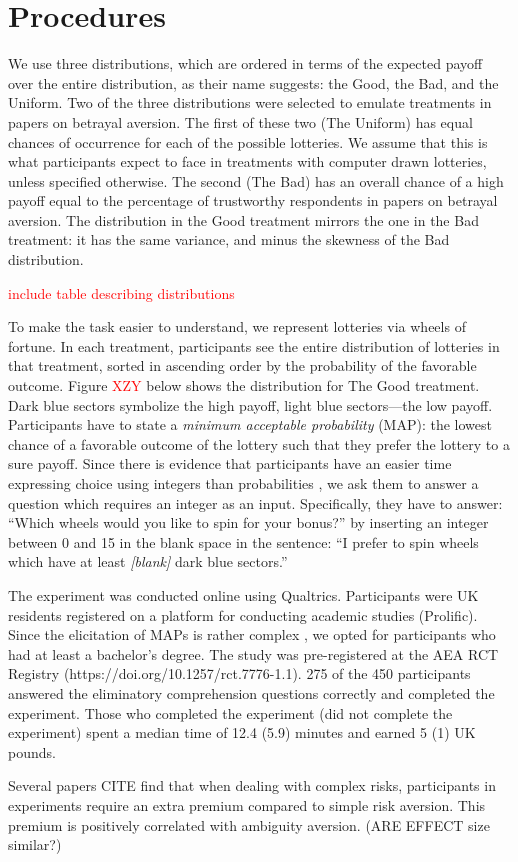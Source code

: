 \section{Procedures}\label{sec:proced}
We use three distributions, which are ordered in terms of the expected payoff over the entire distribution, as their name suggests: the Good, the Bad, and the Uniform.
Two of the three distributions were selected to emulate treatments in papers on betrayal aversion.
The first of these two (The Uniform) has equal chances of occurrence for each of the possible lotteries.
We assume that this is what participants expect to face in treatments with computer drawn lotteries, unless specified otherwise.
The second (The Bad) has an overall chance of a high payoff equal to the percentage of trustworthy respondents in papers on betrayal aversion.
The distribution in the Good treatment mirrors the one in the Bad treatment: it has the same variance, and minus the skewness of the Bad distribution.

\textcolor{red}{include table describing distributions}

To make the task easier to understand, we represent lotteries via wheels of fortune.
In each treatment, participants see the entire distribution of lotteries in that treatment, sorted in ascending order by the probability of the favorable outcome.
Figure \textcolor{red}{XZY} below shows the distribution for The Good treatment.
Dark blue sectors symbolize the high payoff, light blue sectors---the low payoff.
Participants have to state a \textit{minimum acceptable probability} (MAP): the lowest chance of a favorable outcome of the lottery such that they prefer the lottery to a sure payoff.
Since there is evidence that participants have an easier time expressing choice using integers than probabilities \citep{Quercia2016}, we ask them to answer a question which requires an integer as an input.
Specifically, they have to answer: ``Which wheels would you like to spin for your bonus?'' by inserting an integer between 0 and 15 in the blank space in the sentence: ``I prefer to spin wheels which have at least \textit{[blank]} dark blue sectors.''

The experiment was conducted online using Qualtrics.
Participants were UK residents registered on a platform for conducting academic studies (Prolific).
Since the elicitation of MAPs is rather complex \citep{Quercia2016,Polipciuc2020}, we opted for participants who had at least a bachelor's degree.
The study was pre-registered at the AEA RCT Registry (https://doi.org/10.1257/rct.7776-1.1).
275 of the 450 participants answered the eliminatory comprehension questions correctly and completed the experiment.
Those who completed the experiment (did not complete the experiment) spent a median time of 12.4 (5.9) minutes and earned 5 (1) UK pounds.




Several papers CITE find that when dealing with complex risks, participants in experiments require an extra premium compared to simple risk aversion.
This premium is positively correlated with ambiguity aversion. (ARE EFFECT size similar?)


\clearpage
\pagebreak




